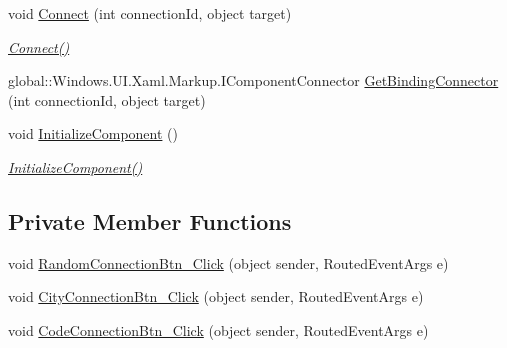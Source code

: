 \begin{DoxyCompactItemize}
void \hyperlink{class_e_l_i_client_1_1_main_page_a0c1c77db7411dc2fda3c8ca08933b0e4}{Connect} (int connection\+Id, object target)
\begin{DoxyCompactList}\small\item\em \hyperlink{class_e_l_i_client_1_1_main_page_a0c1c77db7411dc2fda3c8ca08933b0e4}{Connect()} \end{DoxyCompactList}\item 
global\+::\+Windows.\+U\+I.\+Xaml.\+Markup.\+I\+Component\+Connector \hyperlink{class_e_l_i_client_1_1_main_page_a9d43e9315d46dfb8b65575540e3d939b}{Get\+Binding\+Connector} (int connection\+Id, object target)
\item 
void \hyperlink{class_e_l_i_client_1_1_main_page_a337e38b87a30d8d30bcc2a9164f0ac41}{Initialize\+Component} ()
\begin{DoxyCompactList}\small\item\em \hyperlink{class_e_l_i_client_1_1_main_page_a337e38b87a30d8d30bcc2a9164f0ac41}{Initialize\+Component()} \end{DoxyCompactList}\end{DoxyCompactItemize}
\subsection*{Private Member Functions}
\begin{DoxyCompactItemize}
\item 
void \hyperlink{class_e_l_i_client_1_1_main_page_a397fb6213026f646c778a18100e16220}{Random\+Connection\+Btn\+\_\+\+Click} (object sender, Routed\+Event\+Args e)
\item 
void \hyperlink{class_e_l_i_client_1_1_main_page_a8a45fae6aa34a70c9b607841561dd2a7}{City\+Connection\+Btn\+\_\+\+Click} (object sender, Routed\+Event\+Args e)
\item 
void \hyperlink{class_e_l_i_client_1_1_main_page_ac43e9da28f7318af4816358bb2658b07}{Code\+Connection\+Btn\+\_\+\+Click} (object sender, Routed\+Event\+Args e)
\end{DoxyCompactItemize}

